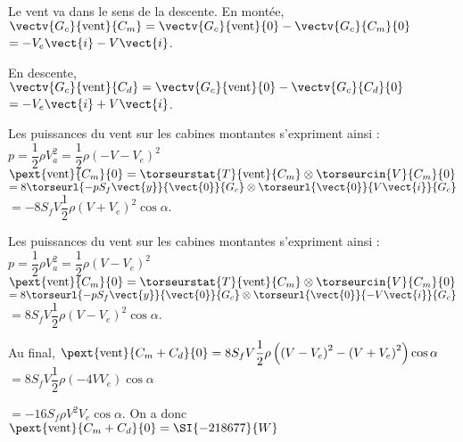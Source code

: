 \ifprof\begin{corrige}

Le vent va dans le sens de la descente.  En montée, 
$\vectv{G_c}{\text{vent}}{C_m}=\vectv{G_c}{\text{vent}}{0}-\vectv{G_c}{C_m}{0}$ $=-V_e\vect{i} - V\vect{i}$.

En descente, 
$\vectv{G_c}{\text{vent}}{C_d}=\vectv{G_c}{\text{vent}}{0}-\vectv{G_c}{C_d}{0}$ $=-V_e\vect{i} + V\vect{i}$.

Les puissances du vent  sur les cabines montantes s'expriment ainsi : 
$p = \dfrac{1}{2}\rho V_a^2 = \dfrac{1}{2}\rho \left(-V-V_e\right)^2 $
$\pext{\text{vent}}{C_m}{0} = \torseurstat{T}{\text{vent}}{C_m} \otimes \torseurcin{V}{C_m}{0}$
$ = 8 \torseurl{-pS_f\vect{y}}{\vect{0}}{G_c} \otimes \torseurl{\vect{0}}{V\vect{i}}{G_c}	$
$ = -8S_fV\dfrac{1}{2}\rho \left(V+V_e\right)^2 \cos\alpha$.


Les puissances du vent  sur les cabines montantes s'expriment ainsi : 
$p = \dfrac{1}{2}\rho V_a^2 = \dfrac{1}{2}\rho \left(V-V_e\right)^2 $
$\pext{\text{vent}}{C_m}{0} = \torseurstat{T}{\text{vent}}{C_m} \otimes \torseurcin{V}{C_m}{0}$
$ = 8 \torseurl{-pS_f\vect{y}}{\vect{0}}{G_c} \otimes \torseurl{\vect{0}}{-V\vect{i}}{G_c}	$
$ =8S_fV\dfrac{1}{2}\rho \left(V-V_e\right)^2 \cos\alpha$.

Au final, $\pext{\text{vent}}{C_m+C_d}{0} =8S_fV\dfrac{1}{2}\rho \left(\left(V-V_e\right)^2- \left(V+V_e\right)^2\right)\cos\alpha$ $=8S_fV\dfrac{1}{2}\rho\left( -4VV_e\right)\cos\alpha$

$=-16S_f \rho V^2 V_e\cos\alpha$. On a donc 
$\pext{\text{vent}}{C_m+C_d}{0} = \SI{-218677}{W} $
\end{corrige}\else\fi


